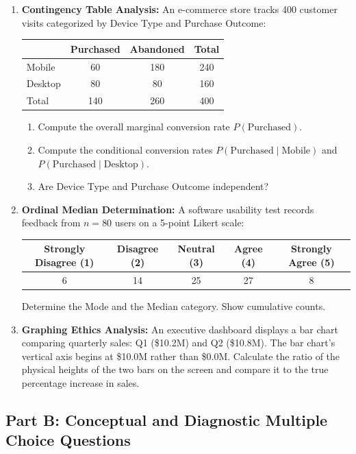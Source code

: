 \begin{enumerate}
    \item \textbf{Contingency Table Analysis:} An e-commerce store tracks 400 customer visits categorized by Device Type and Purchase Outcome:
    \begin{center}
    \begin{tabular}{l|cc|c}
    & Purchased & Abandoned & Total \\
    \hline
    Mobile & 60 & 180 & 240 \\
    Desktop & 80 & 80 & 160 \\
    \hline
    Total & 140 & 260 & 400 \\
    \end{tabular}
    \end{center}
    \begin{enumerate}
        \item Compute the overall marginal conversion rate $P(\text{Purchased})$.
        \item Compute the conditional conversion rates $P(\text{Purchased} \mid \text{Mobile})$ and $P(\text{Purchased} \mid \text{Desktop})$.
        \item Are Device Type and Purchase Outcome independent?
    \end{enumerate}

    \item \textbf{Ordinal Median Determination:} A software usability test records feedback from $n = 80$ users on a 5-point Likert scale:
    \begin{center}
    \begin{tabular}{ccccc}
    Strongly Disagree (1) & Disagree (2) & Neutral (3) & Agree (4) & Strongly Agree (5) \\
    \hline
    6 & 14 & 25 & 27 & 8 \\
    \end{tabular}
    \end{center}
    Determine the Mode and the Median category. Show cumulative counts.

    \item \textbf{Graphing Ethics Analysis:} An executive dashboard displays a bar chart comparing quarterly sales: Q1 (\$10.2M) and Q2 (\$10.8M). The bar chart's vertical axis begins at \$10.0M rather than \$0.0M. Calculate the ratio of the physical heights of the two bars on the screen and compare it to the true percentage increase in sales.
\end{enumerate}

\subsection*{Part B: Conceptual and Diagnostic Multiple Choice Questions}

